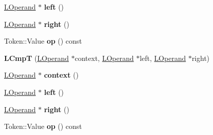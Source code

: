 \begin{DoxyCompactItemize}
\item 
\hyperlink{classv8_1_1internal_1_1_l_operand}{L\+Operand} $\ast$ {\bfseries left} ()\hypertarget{classv8_1_1internal_1_1_l_cmp_t_a6468d4b481e8c5ea5d268ad8b9bb0770}{}\label{classv8_1_1internal_1_1_l_cmp_t_a6468d4b481e8c5ea5d268ad8b9bb0770}

\item 
\hyperlink{classv8_1_1internal_1_1_l_operand}{L\+Operand} $\ast$ {\bfseries right} ()\hypertarget{classv8_1_1internal_1_1_l_cmp_t_a13a757622a5ddbff0584adc3b84baa8d}{}\label{classv8_1_1internal_1_1_l_cmp_t_a13a757622a5ddbff0584adc3b84baa8d}

\item 
Token\+::\+Value {\bfseries op} () const \hypertarget{classv8_1_1internal_1_1_l_cmp_t_affeb8a538e036a9115089631b13671f8}{}\label{classv8_1_1internal_1_1_l_cmp_t_affeb8a538e036a9115089631b13671f8}

\item 
{\bfseries L\+CmpT} (\hyperlink{classv8_1_1internal_1_1_l_operand}{L\+Operand} $\ast$context, \hyperlink{classv8_1_1internal_1_1_l_operand}{L\+Operand} $\ast$left, \hyperlink{classv8_1_1internal_1_1_l_operand}{L\+Operand} $\ast$right)\hypertarget{classv8_1_1internal_1_1_l_cmp_t_af9639e776ae4b34555d2d8b124fd06a2}{}\label{classv8_1_1internal_1_1_l_cmp_t_af9639e776ae4b34555d2d8b124fd06a2}

\item 
\hyperlink{classv8_1_1internal_1_1_l_operand}{L\+Operand} $\ast$ {\bfseries context} ()\hypertarget{classv8_1_1internal_1_1_l_cmp_t_a0beea53d13e064416006b17596aae2a1}{}\label{classv8_1_1internal_1_1_l_cmp_t_a0beea53d13e064416006b17596aae2a1}

\item 
\hyperlink{classv8_1_1internal_1_1_l_operand}{L\+Operand} $\ast$ {\bfseries left} ()\hypertarget{classv8_1_1internal_1_1_l_cmp_t_a6468d4b481e8c5ea5d268ad8b9bb0770}{}\label{classv8_1_1internal_1_1_l_cmp_t_a6468d4b481e8c5ea5d268ad8b9bb0770}

\item 
\hyperlink{classv8_1_1internal_1_1_l_operand}{L\+Operand} $\ast$ {\bfseries right} ()\hypertarget{classv8_1_1internal_1_1_l_cmp_t_a13a757622a5ddbff0584adc3b84baa8d}{}\label{classv8_1_1internal_1_1_l_cmp_t_a13a757622a5ddbff0584adc3b84baa8d}

\item 
Token\+::\+Value {\bfseries op} () const \hypertarget{classv8_1_1internal_1_1_l_cmp_t_affeb8a538e036a9115089631b13671f8}{}\label{classv8_1_1internal_1_1_l_cmp_t_affeb8a538e036a9115089631b13671f8}


\end{DoxyCompactItemize}
